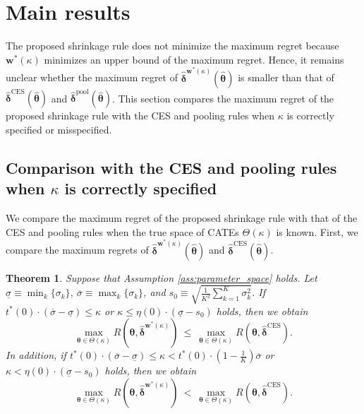 \documentclass[12pt,a4paper]{article}
\newtheorem{Theorem}{Theorem}
\begin{document}
\section{Main results}\label{Sec:main}

The proposed shrinkage rule does not minimize the maximum regret because $\bm{w}^{\ast}(\kappa)$ minimizes an upper bound of the maximum regret. Hence, it remains unclear whether the maximum regret of $\hat{\bm{\delta}}^{\bm{w}^{\ast}(\kappa)}(\hat{\bm{\theta}})$ is smaller than that of $\hat{\bm{\delta}}^{\text{CES}}(\hat{\bm{\theta}})$ and $\hat{\bm{\delta}}^{\mathrm{pool}}(\hat{\bm{\theta}})$. This section compares the maximum regret of the proposed shrinkage rule with the CES and pooling rules when $\kappa$ is correctly specified or misspecified.

\subsection{Comparison with the CES and pooling rules when $\kappa$ is correctly specified}\label{SubSec:correct}
We compare the maximum regret of the proposed shrinkage rule with that of the CES and pooling rules when the true space of CATEs $\Theta(\kappa)$ is known. First, we compare the maximum regrets of $\hat{\bm{\delta}}^{\bm{w}^{\ast}(\kappa)}(\hat{\bm{\theta}})$ and $\hat{\bm{\delta}}^{\text{CES}}(\hat{\bm{\theta}})$.

\begin{Theorem}\label{thm:CES_correct}
Suppose that Assumption \ref{ass:parameter_space} holds. Let $\underline{\sigma} \equiv \min_k \{ \sigma_k \}$, $\overline{\sigma} \equiv \max_k \{ \sigma_k \}$, and $s_0 \equiv \sqrt{\frac{1}{K^2} \sum_{k=1}^K \sigma_k^2}$. If $t^{\ast}(0) \cdot (\overline{\sigma} - \underline{\sigma}) \leq \kappa$ or $\kappa \leq \eta(0) \cdot (\underline{\sigma} - s_0)$ holds, then we obtain
$$
\max_{\bm{\theta} \in \Theta(\kappa)} R(\bm{\theta},\hat{\bm{\delta}}^{\bm{w}^{\ast}(\kappa)}) \ \leq \ \max_{\bm{\theta} \in \Theta(\kappa)} R(\bm{\theta},\hat{\bm{\delta}}^{\mathrm{CES}}).
$$
In addition, if $t^{\ast}(0) \cdot (\overline{\sigma} - \underline{\sigma}) \leq \kappa < t^{\ast}(0) \cdot \left( 1-\frac{1}{K} \right) \overline{\sigma}$ or $\kappa < \eta(0) \cdot ( \underline{\sigma} - s_0 )$ holds, then we obtain
\begin{equation}
\max_{\bm{\theta} \in \Theta(\kappa)} R(\bm{\theta},\hat{\bm{\delta}}^{\bm{w}^{\ast}(\kappa)}) \ < \ \max_{\bm{\theta} \in \Theta(\kappa)} R(\bm{\theta},\hat{\bm{\delta}}^{\mathrm{CES}}). \label{ineq_CES_correct}
\end{equation}
\end{Theorem}
\end{document}
